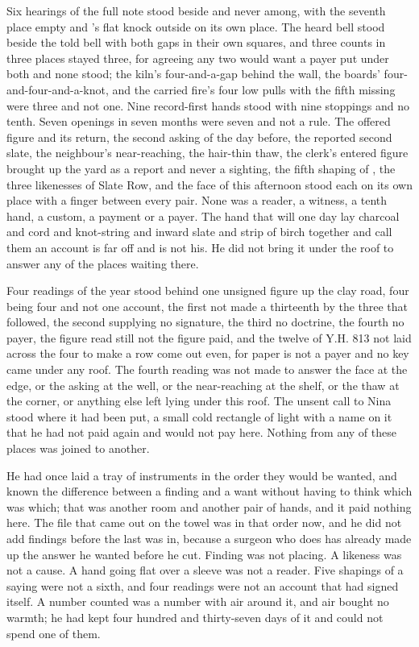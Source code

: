 Six hearings of the full note stood beside and never among, with the seventh place empty and 's flat knock outside on its own place. The heard bell stood beside the told bell with both gaps in their own squares, and three counts in three places stayed three, for agreeing any two would want a payer put under both and none stood; the kiln's four-and-a-gap behind the wall, the boards' four-and-four-and-a-knot, and the carried fire's four low pulls with the fifth missing were three and not one. Nine record-first hands stood with nine stoppings and no tenth. Seven openings in seven months were seven and not a rule. The offered figure and its return, the second asking of the day before, the reported second slate, the neighbour's near-reaching, the hair-thin thaw, the clerk's entered figure brought up the yard as a report and never a sighting, the fifth shaping of , the three likenesses of Slate Row, and the face of this afternoon stood each on its own place with a finger between every pair. None was a reader, a witness, a tenth hand, a custom, a payment or a payer. The hand that will one day lay charcoal and cord and knot-string and inward slate and strip of birch together and call them an account is far off and is not his. He did not bring it under the roof to answer any of the places waiting there.

Four readings of the year stood behind one unsigned figure up the clay road, four being four and not one account, the first not made a thirteenth by the three that followed, the second supplying no signature, the third no doctrine, the fourth no payer, the figure read still not the figure paid, and the twelve of Y.H. 813 not laid across the four to make a row come out even, for paper is not a payer and no key came under any roof. The fourth reading was not made to answer the face at the edge, or the asking at the well, or the near-reaching at the shelf, or the thaw at the corner, or anything else left lying under this roof. The unsent call to Nina stood where it had been put, a small cold rectangle of light with a name on it that he had not paid again and would not pay here. Nothing from any of these places was joined to another.

He had once laid a tray of instruments in the order they would be wanted, and known the difference between a finding and a want without having to think which was which; that was another room and another pair of hands, and it paid nothing here. The file that came out on the towel was in that order now, and he did not add findings before the last was in, because a surgeon who does has already made up the answer he wanted before he cut. Finding was not placing. A likeness was not a cause. A hand going flat over a sleeve was not a reader. Five shapings of a saying were not a sixth, and four readings were not an account that had signed itself. A number counted was a number with air around it, and air bought no warmth; he had kept four hundred and thirty-seven days of it and could not spend one of them.

